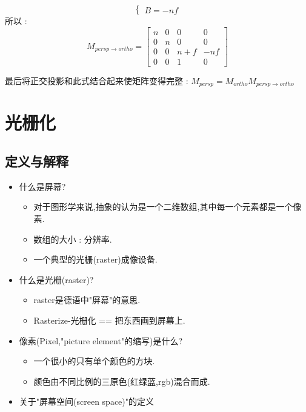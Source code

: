 {{{\begin{itemize}
{\begin{itemize}
{$$\begin{cases}
                          B = -nf
                        \end{cases}
                      $$
                      所以 : $$
                        M_{persp \to ortho}
                        =
                        \begin{bmatrix}
                          n & 0 & 0     & 0   \\
                          0 & n & 0     & 0   \\
                          0 & 0 & n + f & -nf \\
                          0 & 0 & 1     & 0
                        \end{bmatrix}
                      $$

                      最后将正交投影和此式结合起来使矩阵变得完整 : $M_{persp} = M_{ortho}M_{persp \to ortho}$
                      }
              \end{itemize}
              }
      \end{itemize}

    }%

   }%

  \section{光栅化}{

    \subsection{定义与解释}{
      \begin{itemize}
        \item {
              什么是屏幕?
              \begin{itemize}
                \item 对于图形学来说,抽象的认为是一个二维数组,其中每一个元素都是一个像素.
                \item 数组的大小 : 分辨率.
                \item 一个典型的光栅(raster)成像设备.
              \end{itemize}
              }
        \item{
              什么是光栅(raster)?
              \begin{itemize}
                \item raster是德语中"屏幕"的意思.
                \item Rasterize-光栅化 == 把东西画到屏幕上.
              \end{itemize}
              }
        \item{
              像素(Pixel,"picture element"的缩写)是什么?
              \begin{itemize}
                \item 一个很小的只有单个颜色的方块.
                \item 颜色由不同比例的三原色(红绿蓝,rgb)混合而成.
              \end{itemize}
              }
        \item{
              关于"屏幕空间(screen space)"的定义

}
\end{itemize}}}}
